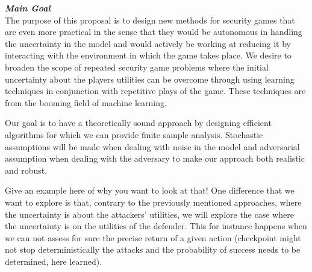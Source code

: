 

\noindent \textit{\textbf{Main Goal}}\\ The purpose of this proposal is to design new methods for security games that are even more practical  in the sense that they would be autonomous in handling the uncertainty in the model and would actively be working at reducing it by interacting with the environment in which the game takes place. We desire to broaden the scope of repeated security game problems where the initial uncertainty about the players utilities can be overcome through using learning techniques  in conjunction with  repetitive plays of the game. These techniques are from the booming field of machine learning.



Our goal is to have a theoretically sound approach by designing efficient algorithms for which we can provide finite sample analysis.
Stochastic assumptions will be made when dealing with noise in the model and adversarial assumption when dealing with the adversary to make our approach both realistic and robust.

Give an example here of why you want to look at that!
One difference that we want to explore is that, contrary to the previously mentioned approaches, where the uncertainty is  about the attackers' utilities, we will explore the case where the uncertainty is on the utilities of the defender. This for instance happens when we can not assess for sure the precise return of a given action (checkpoint might not stop deterministically the attacks and the probability of success needs to be determined, here learned).





